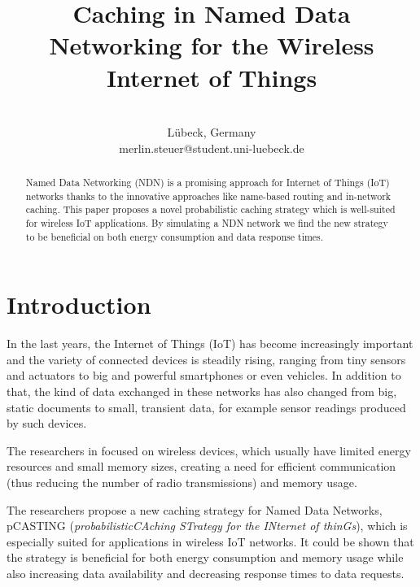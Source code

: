 \documentclass[conference]{IEEEtran}
\begin{document}
\title{Caching in Named Data Networking for the Wireless Internet of Things}

\author{
\\
Lübeck, Germany \\
merlin.steuer@student.uni-luebeck.de
}

\maketitle

\begin{abstract}
Named Data Networking (NDN) is a promising approach for Internet of Things (IoT) networks thanks to the innovative approaches like name-based routing and in-network caching. This paper proposes a novel probabilistic caching strategy which is well-suited for wireless IoT applications. By simulating a NDN network we find the new strategy to be beneficial on both energy consumption and data response times.
\end{abstract}


\section{Introduction}

In the last years, the Internet of Things (IoT) has become increasingly important and the variety of connected devices is steadily rising, ranging from tiny sensors and actuators to big and powerful smartphones or even vehicles. In addition to that, the kind of data exchanged in these networks has also changed from big, static documents to small, transient data, for example sensor readings produced by such devices.

The researchers in \cite{Hail2015} focused on wireless devices, which usually have limited energy resources and small memory sizes, creating a need for efficient communication (thus reducing the number of radio transmissions) and memory usage.

The researchers propose a new caching strategy for Named Data Networks, {pCASTING} (\textit{probabilisticCAching STrategy for the INternet of thinGs}), which is especially suited for applications in wireless IoT networks. It could be shown that the strategy is beneficial for both energy consumption and memory usage while also increasing data availability and decreasing response times to data requests.
\end{document}
